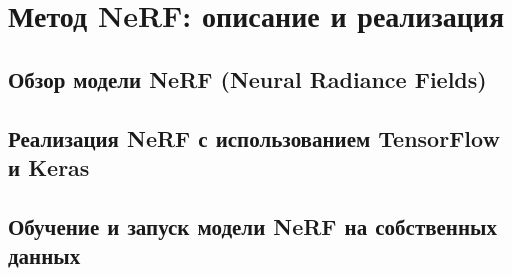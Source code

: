 \chapter{Метод NeRF: описание и реализация}

\section{Обзор модели NeRF (Neural Radiance Fields)}
\section{Реализация NeRF с использованием TensorFlow и Keras}
\section{Обучение и запуск модели NeRF на собственных данных}

